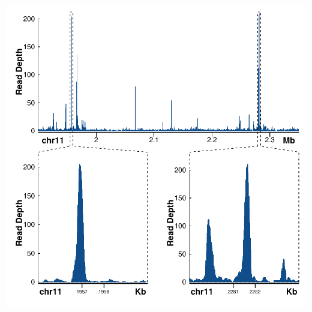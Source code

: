 \documentclass{article}
\begin{document}
\begin{center}
\includegraphics{Sushi-038}
\end{center}
\end{document}
